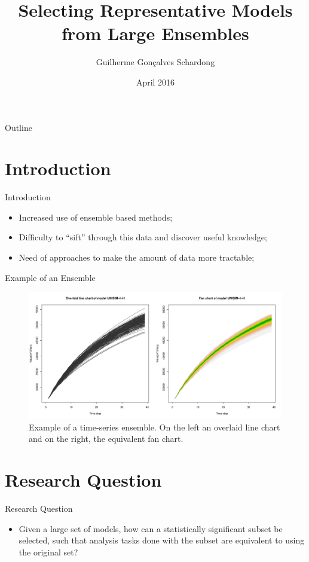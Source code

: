 \documentclass{beamer}
\title{Selecting Representative Models from Large Ensembles}
\author{Guilherme Gon\c{c}alves Schardong}
\date{April 2016}
\begin{document}
	
\begin{frame}
  \titlepage
\end{frame}

\begin{frame}{Outline}
  \tableofcontents
\end{frame}

\section{Introduction}
\begin{frame}{Introduction}
  \begin{itemize}
    \item Increased use of ensemble based methods;
    \item Difficulty to ``sift'' through this data and discover useful knowledge;
    \item Need of approaches to make the amount of data more tractable;
  \end{itemize}
\end{frame}

\begin{frame}{Example of an Ensemble}
  \begin{figure}
    \includegraphics[width=\columnwidth]{line-fan.pdf}
    \caption{Example of a time-series ensemble. On the left an overlaid line chart and on the right, the equivalent fan chart.}
    \label{fig:sample}
  \end{figure}
\end{frame}

\section{Research Question}
\begin{frame}{Research Question}
  \begin{itemize}
    \item Given a large set of models, how can a statistically significant subset be selected, such that analysis tasks done with the subset are equivalent to using the original set?
  \end{itemize}
\end{frame}
\end{document}
